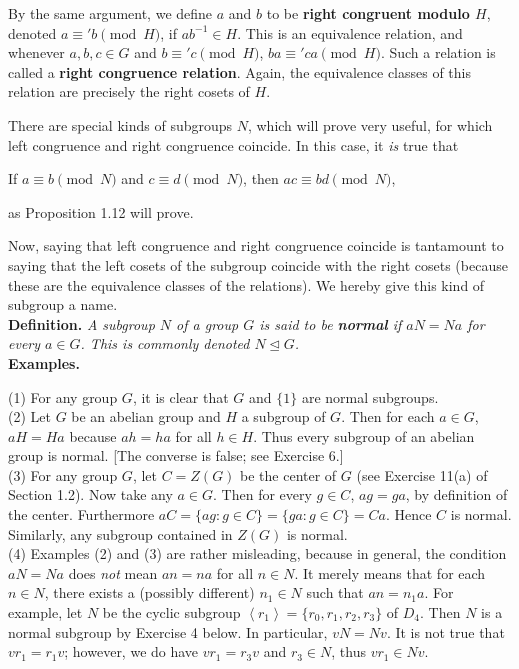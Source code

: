 \documentclass[leqno]{book}
\begin{document}
By the same argument, we define $a$ and $b$ to be \textbf{right congruent modulo $H$}, denoted $a\equiv'b\pmod H$, if $ab^{-1}\in H$.  This is an equivalence relation, and whenever $a,b,c\in G$ and $b\equiv'c\pmod H$, $ba\equiv'ca\pmod H$.  Such a relation is called a \textbf{right congruence relation}.  Again, the equivalence classes of this relation are precisely the right cosets of $H$.

There are special kinds of subgroups $N$, which will prove very useful, for which left congruence and right congruence coincide.  In this case, it \emph{is} true that
\begin{center}
If $a\equiv b\pmod N$ and $c\equiv d\pmod N$, then $ac\equiv bd\pmod N$,
\end{center}
as Proposition 1.12 will prove.

Now, saying that left congruence and right congruence coincide is tantamount to saying that the left cosets of the subgroup coincide with the right cosets (because these are the equivalence classes of the relations).  We hereby give this kind of subgroup a name.\\

\noindent\textbf{Definition.} \emph{A subgroup $N$ of a group $G$ is said to be \textbf{normal} if $aN=Na$ for every $a\in G$.  This is commonly denoted $N\unlhd G$.}\\

\noindent\textbf{Examples.}

(1) For any group $G$, it is clear that $G$ and $\{1\}$ are normal subgroups.\\

(2) Let $G$ be an abelian group and $H$ a subgroup of $G$.  Then for each $a\in G$, $aH=Ha$ because $ah=ha$ for all $h\in H$.  Thus every subgroup of an abelian group is normal.  [The converse is false; see Exercise 6.]\\

(3) For any group $G$, let $C=Z(G)$ be the center of $G$ (see Exercise 11(a) of Section 1.2).  Now take any $a\in G$.  Then for every $g\in C$, $ag=ga$, by definition of the center.  Furthermore $aC=\{ag:g\in C\}=\{ga:g\in C\}=Ca$.  Hence $C$ is normal.  Similarly, any subgroup contained in $Z(G)$ is normal.\\

(4) Examples (2) and (3) are rather misleading, because in general, the condition $aN=Na$ does \emph{not} mean $an=na$ for all $n\in N$.  It merely means that for each $n\in N$, there exists a (possibly different) $n_1\in N$ such that $an=n_1a$.  For example, let $N$ be the cyclic subgroup $\left<r_1\right>=\{r_0,r_1,r_2,r_3\}$ of $D_4$.  Then $N$ is a normal subgroup by Exercise 4 below.  In particular, $vN=Nv$.  It is not true that $vr_1=r_1v$; however, we do have $vr_1=r_3v$ and $r_3\in N$, thus $vr_1\in Nv$.\\
\end{document}
